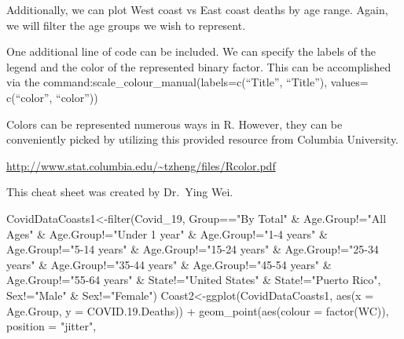 \documentclass[
]{article}
\newenvironment{Shaded}{\begin{snugshade}}{\end{snugshade}}
\newcommand{\AttributeTok}[1]{\textcolor[rgb]{0.77,0.63,0.00}{#1}}
\newcommand{\FloatTok}[1]{\textcolor[rgb]{0.00,0.00,0.81}{#1}}
\newcommand{\FunctionTok}[1]{\textcolor[rgb]{0.00,0.00,0.00}{#1}}
\newcommand{\NormalTok}[1]{#1}
\newcommand{\OtherTok}[1]{\textcolor[rgb]{0.56,0.35,0.01}{#1}}
\newcommand{\SpecialCharTok}[1]{\textcolor[rgb]{0.00,0.00,0.00}{#1}}
\newcommand{\StringTok}[1]{\textcolor[rgb]{0.31,0.60,0.02}{#1}}
\begin{document}
Additionally, we can plot West coast vs East coast deaths by age range.
Again, we will filter the age groups we wish to represent.

One additional line of code can be included. We can specify the labels
of the legend and the color of the represented binary factor. This can
be accomplished via the
command:scale\_colour\_manual(labels=c(``Title'', ``Title''), values=
c(``color'', ``color''))

Colors can be represented numerous ways in R. However, they can be
conveniently picked by utilizing this provided resource from Columbia
University.

\url{http://www.stat.columbia.edu/~tzheng/files/Rcolor.pdf}

This cheat sheet was created by Dr.~Ying Wei.

\begin{Shaded}
\begin{Highlighting}[]
\NormalTok{CovidDataCoasts1}\OtherTok{\textless{}{-}}\FunctionTok{filter}\NormalTok{(Covid\_19, Group}\SpecialCharTok{==}\StringTok{"By Total"} \SpecialCharTok{\&}\NormalTok{ Age.Group}\SpecialCharTok{!=}\StringTok{"All Ages"} \SpecialCharTok{\&}\NormalTok{ Age.Group}\SpecialCharTok{!=}\StringTok{"Under 1 year"} \SpecialCharTok{\&}\NormalTok{ Age.Group}\SpecialCharTok{!=}\StringTok{"1{-}4 years"} \SpecialCharTok{\&}\NormalTok{ Age.Group}\SpecialCharTok{!=}\StringTok{"5{-}14 years"} \SpecialCharTok{\&}\NormalTok{ Age.Group}\SpecialCharTok{!=}\StringTok{"15{-}24 years"} \SpecialCharTok{\&}\NormalTok{ Age.Group}\SpecialCharTok{!=}\StringTok{"25{-}34 years"} \SpecialCharTok{\&}\NormalTok{ Age.Group}\SpecialCharTok{!=}\StringTok{"35{-}44 years"} \SpecialCharTok{\&}\NormalTok{ Age.Group}\SpecialCharTok{!=}\StringTok{"45{-}54 years"} \SpecialCharTok{\&}\NormalTok{ Age.Group}\SpecialCharTok{!=}\StringTok{"55{-}64 years"} \SpecialCharTok{\&}\NormalTok{ State}\SpecialCharTok{!=}\StringTok{"United States"} \SpecialCharTok{\&}\NormalTok{ State}\SpecialCharTok{!=}\StringTok{"Puerto Rico"}\NormalTok{, Sex}\SpecialCharTok{!=}\StringTok{"Male"} \SpecialCharTok{\&}\NormalTok{ Sex}\SpecialCharTok{!=}\StringTok{"Female"}\NormalTok{)}
\NormalTok{Coast2}\OtherTok{\textless{}{-}}\FunctionTok{ggplot}\NormalTok{(CovidDataCoasts1, }\FunctionTok{aes}\NormalTok{(}\AttributeTok{x =}\NormalTok{ Age.Group, }\AttributeTok{y =}\NormalTok{ COVID.}\FloatTok{19.}\NormalTok{Deaths)) }\SpecialCharTok{+}
  \FunctionTok{geom\_point}\NormalTok{(}\FunctionTok{aes}\NormalTok{(}\AttributeTok{colour =} \FunctionTok{factor}\NormalTok{(WC)), }
             \AttributeTok{position =} \StringTok{"jitter"}\NormalTok{, }

\end{Highlighting}
\end{Shaded}
\end{document}
